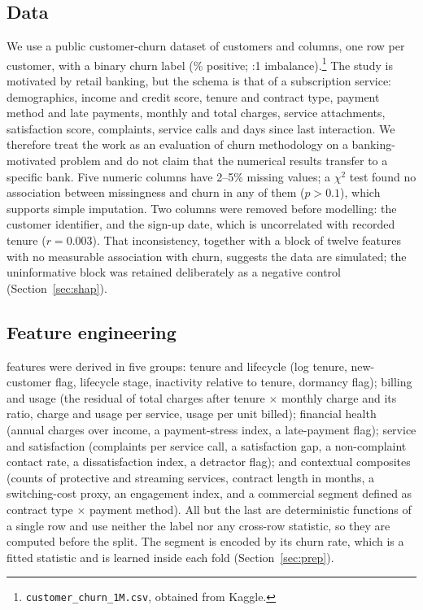 \documentclass[conference]{IEEEtran}
\begin{document}
\subsection{Data}
We use a public customer-churn dataset of \NRows{} customers and \NCols{} columns, one row per customer, with a binary churn label (\ChurnRatePct\% positive; \ImbRatio{}:1 imbalance).\footnote{%
\texttt{customer\_churn\_1M.csv}, obtained from Kaggle.} The study is motivated by retail banking, but the schema is that of a subscription service: demographics, income and credit score, tenure and contract type, payment method and late payments, monthly and total charges, service attachments, satisfaction score, complaints, service calls and days since last interaction. We therefore treat the work as an evaluation of churn methodology on a banking-motivated problem and do not claim that the numerical results transfer to a specific bank. Five numeric columns have 2--5\% missing values; a $\chi^2$ test found no association between missingness and churn in any of them ($p>0.1$), which supports simple imputation. Two columns were removed before modelling: the customer identifier, and the sign-up date, which is uncorrelated with recorded tenure ($r=0.003$). That inconsistency, together with a block of twelve features with no measurable association with churn, suggests the data are simulated; the uninformative block was retained deliberately as a negative control (Section~\ref{sec:shap}).

\subsection{Feature engineering}
\NEngineered{} features were derived in five groups: tenure and lifecycle (log tenure, new-customer flag, lifecycle stage, inactivity relative to tenure, dormancy flag); billing and usage (the residual of total charges after tenure $\times$ monthly charge and its ratio, charge and usage per service, usage per unit billed); financial health (annual charges over income, a payment-stress index, a late-payment flag); service and satisfaction (complaints per service call, a satisfaction gap, a non-complaint contact rate, a dissatisfaction index, a detractor flag); and contextual composites (counts of protective and streaming services, contract length in months, a switching-cost proxy, an engagement index, and a commercial segment defined as contract type $\times$ payment method). All but the last are deterministic functions of a single row and use neither the label nor any cross-row statistic, so they are computed before the split. The segment is encoded by its churn rate, which is a fitted statistic and is learned inside each fold (Section~\ref{sec:prep}).
\end{document}
